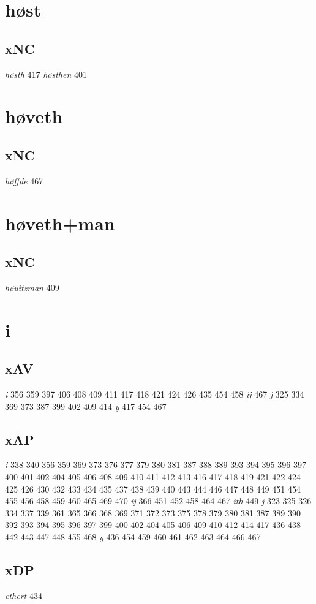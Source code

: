 \documentclass[a4paper,twocolumn]{article}
\begin{document}
\section{høst}
\label{sec:org5d13257}
\subsection{xNC}
\label{sec:org0a21598}
\emph{høsth} 417 \emph{høsthen} 401 
\section{høveth}
\label{sec:org73ccb36}
\subsection{xNC}
\label{sec:org165bb43}
\emph{høffde} 467 
\section{høveth+man}
\label{sec:orgac41de5}
\subsection{xNC}
\label{sec:org183b3bf}
\emph{høuitzman} 409 
\section{i}
\label{sec:org9e2bae1}
\subsection{xAV}
\label{sec:orgae6f3f5}
\emph{i} 356 359 397 406 408 409 411 417 418 421 424 426 435 454 458 \emph{ij} 467 \emph{j} 325 334 369 373 387 399 402 409 414 \emph{y} 417 454 467 
\subsection{xAP}
\label{sec:org400117b}
\emph{i} 338 340 356 359 369 373 376 377 379 380 381 387 388 389 393 394 395 396 397 400 401 402 404 405 406 408 409 410 411 412 413 416 417 418 419 421 422 424 425 426 430 432 433 434 435 437 438 439 440 443 444 446 447 448 449 451 454 455 456 458 459 460 465 469 470 \emph{ij} 366 451 452 458 464 467 \emph{ith} 449 \emph{j} 323 325 326 334 337 339 361 365 366 368 369 371 372 373 375 378 379 380 381 387 389 390 392 393 394 395 396 397 399 400 402 404 405 406 409 410 412 414 417 436 438 442 443 447 448 455 468 \emph{y} 436 454 459 460 461 462 463 464 466 467 
\subsection{xDP}
\label{sec:org24ac3f0}
\emph{ethert} 434 
\end{document}
